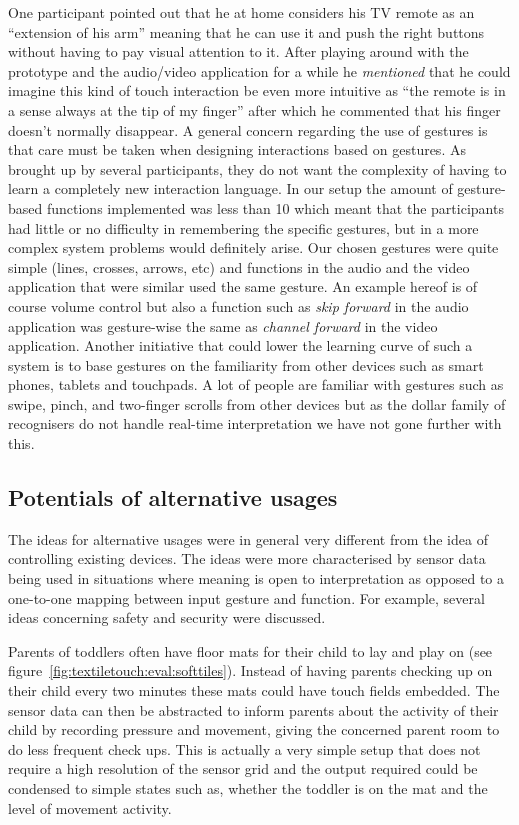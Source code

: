 One participant pointed out that he at home considers his TV remote as an ``extension of his arm'' meaning that he can use it and push the right buttons without having to pay visual attention to it. 
After playing around with the prototype and the audio/video application for a while he \emph{mentioned} that he could imagine this kind of touch interaction be even more intuitive as ``the remote is in a sense always at the tip of my finger'' after which he commented that his finger doesn't normally disappear.
\blank
A general concern regarding the use of gestures is that care must be taken when designing interactions based on gestures.
As brought up by several participants, they do not want the complexity of having to learn a completely new interaction language.
In our setup the amount of gesture-based functions implemented was less than 10 which meant that the participants had little or no difficulty in remembering the specific gestures, but in a more complex system problems would definitely arise.
Our chosen gestures were quite simple (lines, crosses, arrows, etc) and functions in the audio and the video application that were similar used the same gesture.
An example hereof is of course volume control but also a function such as \emph{skip forward} in the audio application was gesture-wise the same as \emph{channel forward} in the video application.
Another initiative that could lower the learning curve of such a system is to base gestures on the familiarity from other devices such as smart phones, tablets and touchpads.
A lot of people are familiar with gestures such as swipe, pinch, and two-finger scrolls from other devices but as the dollar family of recognisers do not handle real-time interpretation we have not gone further with this.

\subsection{Potentials of alternative usages}

The ideas for alternative usages were in general very different from the idea of controlling existing devices.
The ideas were more characterised by sensor data being used in situations where meaning is open to interpretation as opposed to a one-to-one mapping between input gesture and function.
For example, several ideas concerning safety and security were discussed.

Parents of toddlers often have floor mats for their child to lay and play on (see figure~\ref{fig:textiletouch:eval:softtiles}).
Instead of having parents checking up on their child every two minutes these mats could have touch fields embedded.
The sensor data can then be abstracted to inform parents about the activity of their child by recording pressure and movement, giving the concerned parent room to do less frequent check ups.
This is actually a very simple setup that does not require a high resolution of the sensor grid and the output required could be condensed to simple states such as, whether the toddler is on the mat and the level of movement activity.

